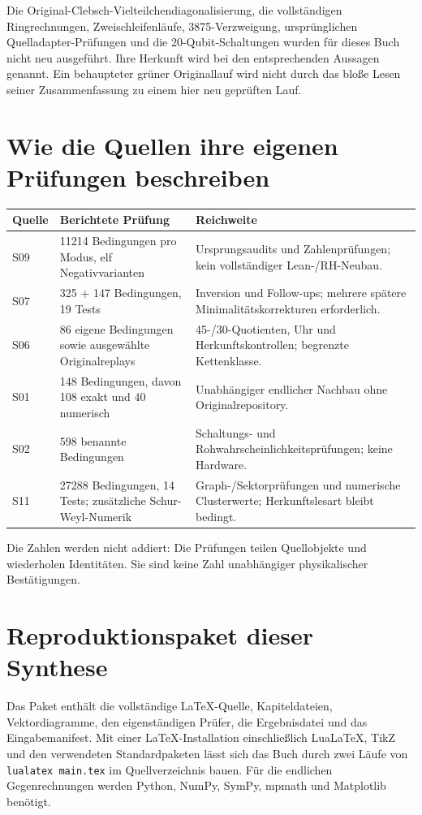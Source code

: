 Die Original-Clebsch-Vielteilchendiagonalisierung, die vollständigen Ringrechnungen, Zweischleifenläufe, 3875-Verzweigung, ursprünglichen Quelladapter-Prüfungen und die 20-Qubit-Schaltungen wurden für dieses Buch nicht neu ausgeführt. Ihre Herkunft wird bei den entsprechenden Aussagen genannt. Ein behaupteter grüner Originallauf wird nicht durch das bloße Lesen seiner Zusammenfassung zu einem hier neu geprüften Lauf.

\section{Wie die Quellen ihre eigenen Prüfungen beschreiben}
\par\noindent\begin{tabularx}{\linewidth}{L{16mm}L{41mm}Y}
\toprule \textbf{Quelle}&\textbf{Berichtete Prüfung}&\textbf{Reichweite}\\\midrule
S09&11214 Bedingungen pro Modus, elf Negativvarianten&Ursprungsaudits und Zahlenprüfungen; kein vollständiger Lean-/RH-Neubau.\\
S07&325 + 147 Bedingungen, 19 Tests&Inversion und Follow-ups; mehrere spätere Minimalitätskorrekturen erforderlich.\\
S06&86 eigene Bedingungen sowie ausgewählte Originalreplays&45-/30-Quotienten, Uhr und Herkunftskontrollen; begrenzte Kettenklasse.\\
S01&148 Bedingungen, davon 108 exakt und 40 numerisch&Unabhängiger endlicher Nachbau ohne Originalrepository.\\
S02&598 benannte Bedingungen&Schaltungs- und Rohwahrscheinlichkeitsprüfungen; keine Hardware.\\
S11&27288 Bedingungen, 14 Tests; zusätzliche Schur-Weyl-Numerik&Graph-/Sektorprüfungen und numerische Clusterwerte; Herkunftslesart bleibt bedingt.\\\bottomrule
\end{tabularx}\par
Die Zahlen werden nicht addiert: Die Prüfungen teilen Quellobjekte und wiederholen Identitäten. Sie sind keine Zahl unabhängiger physikalischer Bestätigungen.

\section{Reproduktionspaket dieser Synthese}
Das Paket enthält die vollständige LaTeX-Quelle, Kapiteldateien, Vektordiagramme, den eigenständigen Prüfer, die Ergebnisdatei und das Eingabemanifest. Mit einer LaTeX-Installation einschließlich LuaLaTeX, TikZ und den verwendeten Standardpaketen lässt sich das Buch durch zwei Läufe von \texttt{lualatex main.tex} im Quellverzeichnis bauen. Für die endlichen Gegenrechnungen werden Python, NumPy, SymPy, mpmath und Matplotlib benötigt.

